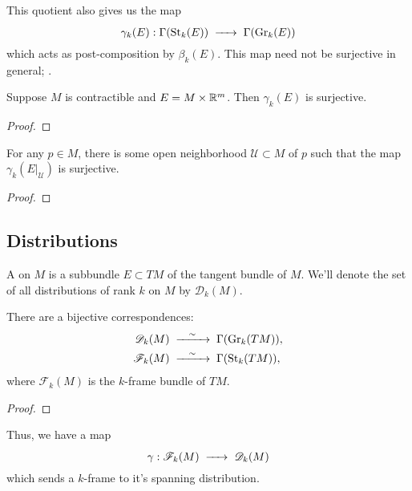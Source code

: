 \documentclass{lkx_paper}
\begin{document}
This quotient also gives us the map
\[
	\gamma_k(E) : \Gamma(\St_k(E)) \longto \Gamma(\Gr_k(E))
\]
which acts as post-composition by $\beta_{k}(E)$. This map need not be surjective in general; .

\begin{proposition}
	Suppose $M$ is contractible and $E=M\times \mathbb{R}^m$. Then $\gamma_k(E)$ is surjective.
\end{proposition}

\begin{proof}
\end{proof}

\begin{proposition}
	\label{local_section_lifting}
	For any $p\in M$, there is some open neighborhood $\mathcal{U}\subset M$ of $p$ such that the map $\gamma_k(E|_\mathcal{U})$ is surjective.
\end{proposition}

\begin{proof}
\end{proof}

\subsection{Distributions}

\begin{definition}
	A  on $M$ is a subbundle $E\subset TM$ of the tangent bundle of $M$. We'll denote the set of all distributions of rank $k$ on $M$ by $\mathscr{D}_k(M)$.
\end{definition}

\begin{proposition}
	There are a bijective correspondences:
	\[
		\begin{aligned}
			\mathscr{D}_k(M) & \longisom \Gamma(\Gr_k(TM)), \\
			\mathscr{F}_k(M) & \longisom \Gamma(\St_k(TM)), \\
		\end{aligned}
	\]
	where $\mathscr{F}_k(M)$ is the $k$-frame bundle of $TM$.
\end{proposition}

\begin{proof}
\end{proof}

Thus, we have a map
\[
	\gamma : \mathscr{F}_k(M) \longto \mathscr{D}_k(M)
\]
which sends a $k$-frame to it's spanning distribution.
\end{document}
